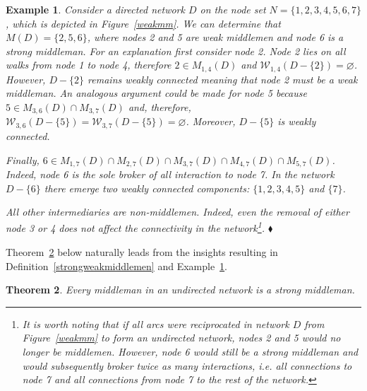 \documentclass[11pt,fleqn]{article}
\newtheorem{theorem}{Theorem}[section]
\newtheorem{expl}[theorem]{Example}
\newenvironment{example}{\begin{expl} \rm}{\hfill $\blacklozenge$ \end{expl}}{}
\begin{document}
\begin{example} \label{identifyingmiddlemen}
Consider a directed network $D$ on the node set $N=\{1,2,3,4,5,6,7\}$, which is depicted in Figure~\ref{weakmm}. We can determine that $M(D)=\{2,5,6\}$, where nodes 2 and 5 are weak middlemen and node 6 is a strong middleman. For an explanation first consider node 2. Node 2 lies on all walks from node 1 to node 4, therefore $2 \in M_{1,4}(D)$ and $\mathcal{W}_{1,4}(D - \{2\}) = \varnothing$. However, $D - \{2\}$ remains weakly connected meaning that node 2 must be a weak middleman. An analogous argument could be made for node 5 because $5 \in M_{3,6}(D) \cap M_{3,7}(D)$ and, therefore, $\mathcal{W}_{3,6}(D - \{5\}) = \mathcal{W}_{3,7}(D - \{5\}) = \varnothing$. Moreover, $D - \{5\}$ is weakly connected.

Finally, $6 \in M_{1,7}(D) \cap M_{2,7}(D) \cap M_{3,7}(D) \cap M_{4,7}(D) \cap M_{5,7}(D)$. Indeed, node 6 is the sole broker of all interaction to node 7. In the network $D - \{6\}$ there emerge two weakly connected components: $\{ 1,2,3,4,5 \}$ and $\{ 7 \}$.

All other intermediaries are non-middlemen. Indeed, even the removal of either node 3 or 4 does not affect the connectivity in the network\footnote{It is worth noting that if all arcs were reciprocated in network $D$ from Figure~\ref{weakmm} to form an undirected network, nodes 2 and 5 would no longer be middlemen. However, node 6 would still be a strong middleman and would subsequently broker twice as many interactions, i.e. all connections to node 7 and all connections from node 7 to the rest of the network.}.
\end{example}

Theorem~\ref{undirectedmiddlemen} below naturally leads from the insights resulting in Definition~\ref{strongweakmiddlemen} and Example~\ref{identifyingmiddlemen}.

\begin{theorem} \label{undirectedmiddlemen}
Every middleman in an undirected network is a strong middleman.
\end{theorem}
\end{document}
